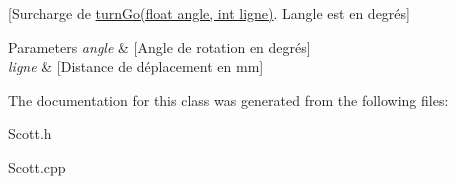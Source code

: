 \mbox{[}Surcharge de \hyperlink{class_scott_ad8d8c12ec3cb4c2cc79534657edbd59e}{turn\+Go(float angle, int ligne)}. L\textquotesingle{}angle est en degrés\mbox{]} 
\begin{DoxyParams}{Parameters}
{\em angle} & \mbox{[}Angle de rotation en degrés\mbox{]} \\
\hline
{\em ligne} & \mbox{[}Distance de déplacement en mm\mbox{]} \\
\hline
\end{DoxyParams}


The documentation for this class was generated from the following files\+:\begin{DoxyCompactItemize}
\item 
Scott.\+h\item 
Scott.\+cpp\end{DoxyCompactItemize}
